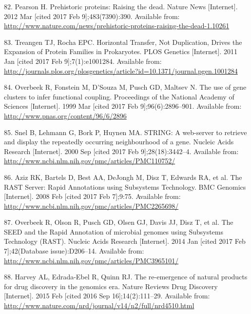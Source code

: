 \documentclass[12pt,twoside]{reedthesis}
\begin{document}
  \hypertarget{ref-pearson_prehistoric_2012}{}
  82. Pearson H. Prehistoric proteins: Raising the dead. Nature News
  {[}Internet{]}. 2012 Mar {[}cited 2017 Feb 9{]};483(7390):390. Available
  from:
  \url{http://www.nature.com/news/prehistoric-proteins-raising-the-dead-1.10261}
  
  \hypertarget{ref-treangen_horizontal_2011}{}
  83. Treangen TJ, Rocha EPC. Horizontal Transfer, Not Duplication, Drives
  the Expansion of Protein Families in Prokaryotes. PLOS Genetics
  {[}Internet{]}. 2011 Jan {[}cited 2017 Feb 9{]};7(1):e1001284. Available
  from:
  \url{http://journals.plos.org/plosgenetics/article?id=10.1371/journal.pgen.1001284}
  
  \hypertarget{ref-overbeek_use_1999}{}
  84. Overbeek R, Fonstein M, D'Souza M, Pusch GD, Maltsev N. The use of
  gene clusters to infer functional coupling. Proceedings of the National
  Academy of Sciences {[}Internet{]}. 1999 Mar {[}cited 2017 Feb
  9{]};96(6):2896--901. Available from:
  \url{http://www.pnas.org/content/96/6/2896}
  
  \hypertarget{ref-snel_string_2000}{}
  85. Snel B, Lehmann G, Bork P, Huynen MA. STRING: A web-server to
  retrieve and display the repeatedly occurring neighbourhood of a gene.
  Nucleic Acids Research {[}Internet{]}. 2000 Sep {[}cited 2017 Feb
  9{]};28(18):3442--4. Available from:
  \url{http://www.ncbi.nlm.nih.gov/pmc/articles/PMC110752/}
  
  \hypertarget{ref-aziz_rast_2008}{}
  86. Aziz RK, Bartels D, Best AA, DeJongh M, Disz T, Edwards RA, et al.
  The RAST Server: Rapid Annotations using Subsystems Technology. BMC
  Genomics {[}Internet{]}. 2008 Feb {[}cited 2017 Feb 7{]};9:75. Available
  from: \url{http://www.ncbi.nlm.nih.gov/pmc/articles/PMC2265698/}
  
  \hypertarget{ref-overbeek_seed_2014}{}
  87. Overbeek R, Olson R, Pusch GD, Olsen GJ, Davis JJ, Disz T, et al.
  The SEED and the Rapid Annotation of microbial genomes using Subsystems
  Technology (RAST). Nucleic Acids Research {[}Internet{]}. 2014 Jan
  {[}cited 2017 Feb 7{]};42(Database issue):D206--14. Available from:
  \url{http://www.ncbi.nlm.nih.gov/pmc/articles/PMC3965101/}
  
  \hypertarget{ref-harvey_re-emergence_2015}{}
  88. Harvey AL, Edrada-Ebel R, Quinn RJ. The re-emergence of natural
  products for drug discovery in the genomics era. Nature Reviews Drug
  Discovery {[}Internet{]}. 2015 Feb {[}cited 2016 Sep
  16{]};14(2):111--29. Available from:
  \url{http://www.nature.com/nrd/journal/v14/n2/full/nrd4510.html}
  
\end{document}
